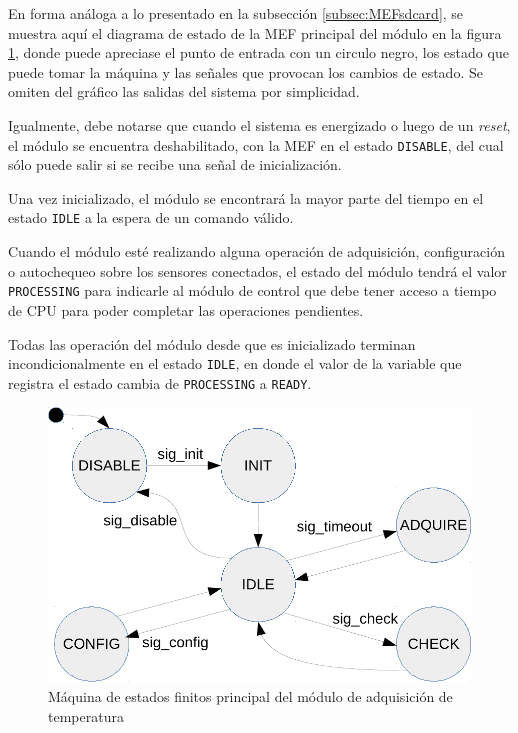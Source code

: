 En forma análoga a lo presentado en la subsección \ref{subsec:MEFsdcard}, se muestra aquí el diagrama de estado de la MEF principal del módulo en la figura \ref{fig:mef_adquisicion}, donde puede apreciase el punto de entrada con un circulo negro, los estado que puede tomar la máquina y las señales que provocan los cambios de estado. Se omiten del gráfico las salidas del sistema por simplicidad. 

Igualmente, debe notarse que cuando el sistema es energizado o luego de un \textit{reset}, el módulo se encuentra deshabilitado, con la MEF en el estado \texttt{DISABLE}, del cual sólo puede salir si se recibe una señal de inicialización.  

Una vez inicializado, el módulo se encontrará la mayor parte del tiempo en el estado \texttt{IDLE} a la espera de un comando válido.  

Cuando el módulo esté realizando alguna operación de adquisición, configuración o autochequeo sobre los sensores conectados, el estado del módulo tendrá el valor \texttt{PROCESSING} para indicarle al módulo de control que debe tener acceso a tiempo de CPU para poder completar las operaciones pendientes.  

Todas las operación del módulo desde que es inicializado terminan incondicionalmente en el estado \texttt{IDLE}, en donde el valor de la variable que registra el estado cambia de \texttt{PROCESSING} a \texttt{READY}.

\begin{figure}[htpb]
	\centering
	\includegraphics[width=\textwidth]{./Figures/MEF_adquisicion.pdf}
	\caption[MEF principal del módulo de adquisición de temperatura]{Máquina de estados finitos principal del módulo de adquisición de temperatura}
	\label{fig:mef_adquisicion}
\end{figure}

